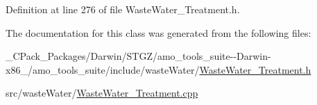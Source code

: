 Definition at line 276 of file Waste\+Water\+\_\+\+Treatment.\+h.



The documentation for this class was generated from the following files\+:\begin{DoxyCompactItemize}
\item 
\+\_\+\+C\+Pack\+\_\+\+Packages/\+Darwin/\+S\+T\+G\+Z/amo\+\_\+tools\+\_\+suite-\/-\/\+Darwin-\/x86\+\_/amo\+\_\+tools\+\_\+suite/include/waste\+Water/\hyperlink{___c_pack___packages_2_darwin_2_s_t_g_z_2amo__tools__suite--_darwin-x86__64_2amo__tools__suite_2e397a2091b0b2529235d99ce4a62cd4a}{Waste\+Water\+\_\+\+Treatment.\+h}\item 
src/waste\+Water/\hyperlink{_waste_water___treatment_8cpp}{Waste\+Water\+\_\+\+Treatment.\+cpp}\end{DoxyCompactItemize}
